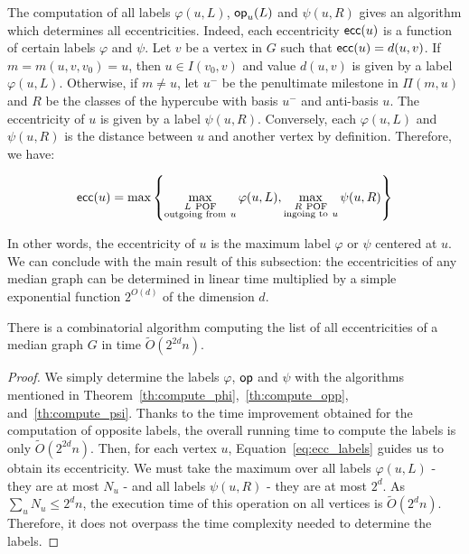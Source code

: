 \documentclass[a4paper,UKenglish,numberwithinsect,cleveref, autoref,anonymous]{lipics-v2021}
\newcommand{\set}[1]{\left\{ #1 \right\}}
\newcommand{\ecc}{\mbox{\textsf{ecc}}}
\newcommand{\opp}{\mbox{\textsf{op}}}
\begin{document}
 The computation of all labels $\varphi(u,L)$, $\opp_u(L)$ and $\psi(u,R)$ gives an algorithm which determines all eccentricities. Indeed, each eccentricity $\ecc(u)$ is a function of certain labels $\varphi$ and $\psi$. Let $v$ be a vertex in $G$ such that $\ecc(u) = d(u,v)$. If $m = m(u,v,v_0) = u$, then $u \in I(v_0,v)$ and value $d(u,v)$ is given by a label $\varphi(u,L)$. Otherwise, if $m \neq u$, let $u^-$ be the penultimate milestone in $\Pi(m,u)$ and $R$ be the classes of the hypercube with basis $u^-$ and anti-basis $u$. The eccentricity of $u$ is given by a label $\psi(u,R)$. Conversely, each $\varphi(u,L)$ and $\psi(u,R)$ is the distance between $u$ and another vertex by definition. Therefore, we have:

\begin{equation}
\ecc(u) = \mbox{max}\set{\max\limits_{\substack{L ~\mbox{\scriptsize{POF}} \\ \mbox{\scriptsize{outgoing from}}~ u}} \varphi(u,L), \max\limits_{\substack{R ~\mbox{\scriptsize{POF}} \\ \mbox{\scriptsize{ingoing to}}~ u}} \psi(u,R)}
\label{eq:ecc_labels}
\end{equation}

In other words, the eccentricity of $u$ is the maximum label $\varphi$ or $\psi$ centered at $u$. We can conclude with the main result of this subsection: the eccentricities of any median graph can be determined in linear time multiplied by a simple exponential function $2^{O(d)}$ of the dimension $d$.

\begin{theorem}
There is a combinatorial algorithm computing the list of all eccentricities of a median graph $G$ in time $\tilde{O}(2^{2d}n)$.
\label{th:simple_ecc}
\end{theorem}
\begin{proof}
We simply determine the labels $\varphi$, $\opp$ and $\psi$ with the algorithms mentioned in Theorem~\ref{th:compute_phi},~\ref{th:compute_opp}, and~\ref{th:compute_psi}. Thanks to the time improvement obtained for the computation of opposite labels, the overall running time to compute the labels is only $\tilde{O}(2^{2d}n)$. Then, for each vertex $u$, Equation~\eqref{eq:ecc_labels} guides us to obtain its eccentricity. We must take the maximum over all labels $\varphi(u,L)$ - they are at most $N_u$ - and all labels $\psi(u,R)$ - they are at most $2^d$. As $\sum_u N_u \le 2^dn$, the execution time of this operation on all vertices is $\tilde{O}(2^dn)$. Therefore, it does not overpass the time complexity needed to determine the labels.
\end{proof}
\end{document}
